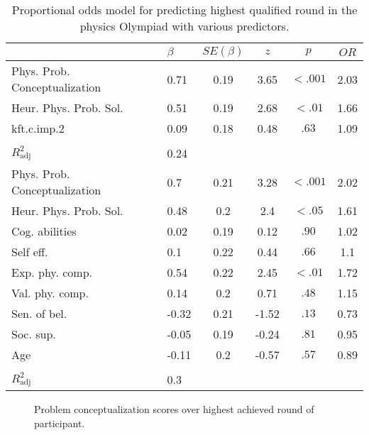 \documentclass[D:/studies/WinnerS/Erhebungen/IPhO1718/paper/problem_solving/main/TaylorFrancis/interactapasample]{subfiles}
\begin{document}
\begin{table}
\caption{Proportional odds model for predicting highest qualified round in the physics Olympiad with various predictors.}
\label{propOddModel}
\begin{tabular}{llcccc}
  \toprule
 & $\beta$ & $SE(\beta)$ & $z$ & $p$ & $OR$ \\ 
  \midrule
Phys. Prob. Conceptualization  & 0.71 & 0.19 & 3.65 & $<.001$ & 2.03 \\ 
  Heur. Phys. Prob. Sol.  & 0.51 & 0.19 & 2.68 & $<.01$ & 1.66 \\ 
  kft.c.imp.2  & 0.09 & 0.18 & 0.48 & $.63$ & 1.09 \\ 
   &  &  &  &  &  \\ 
  $R^2_{\text{adj}}$ & 0.24 &  &  &  &  \\ 
  \midrule Phys. Prob. Conceptualization & 0.7 & 0.21 & 3.28 & $<.001$ & 2.02 \\ 
  Heur. Phys. Prob. Sol. & 0.48 & 0.2 & 2.4 & $<.05$ & 1.61 \\ 
  Cog. abilities & 0.02 & 0.19 & 0.12 & $.90$ & 1.02 \\ 
  Self eff. & 0.1 & 0.22 & 0.44 & $.66$ & 1.1 \\ 
  Exp. phy. comp. & 0.54 & 0.22 & 2.45 & $<.01$ & 1.72 \\ 
  Val. phy. comp. & 0.14 & 0.2 & 0.71 & $.48$ & 1.15 \\ 
  Sen. of bel. & -0.32 & 0.21 & -1.52 & $.13$ & 0.73 \\ 
  Soc. sup. & -0.05 & 0.19 & -0.24 & $.81$ & 0.95 \\ 
  Age & -0.11 & 0.2 & -0.57 & $.57$ & 0.89 \\ 
    &  &  &  &  &  \\ 
  $R^2_{\text{adj}}$  & 0.3 &  &  &  &  \\ 
   \bottomrule
\end{tabular}\end{table}



\begin{figure}
\centering

\caption{Problem conceptualization scores over highest achieved round of participant.}
\label{problem_concept_skills}
\end{figure}
\end{document}

